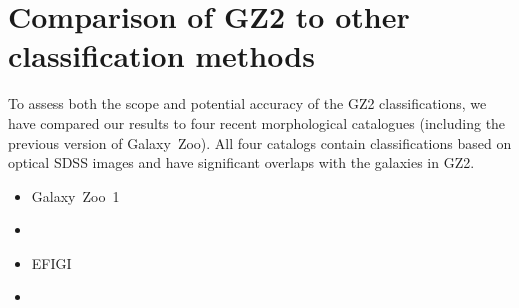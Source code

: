 \documentclass[useAMS,usenatbib]{mn2e}
\begin{document}

\section{Comparison of GZ2 to other classification methods}\label{sec-comparison}

To assess both the scope and potential accuracy of the GZ2 classifications, we have compared our results to four recent morphological catalogues (including the previous version of Galaxy~Zoo). All four catalogs contain classifications based on optical SDSS images and have significant overlaps with the galaxies in GZ2. 

\begin{itemize}
	\item Galaxy~Zoo~1 \citep{lin11}
	\item \citet{nai10}
	\item EFIGI \citep{bai11}
	\item \citet{hue11}
\end{itemize}
\end{document}
